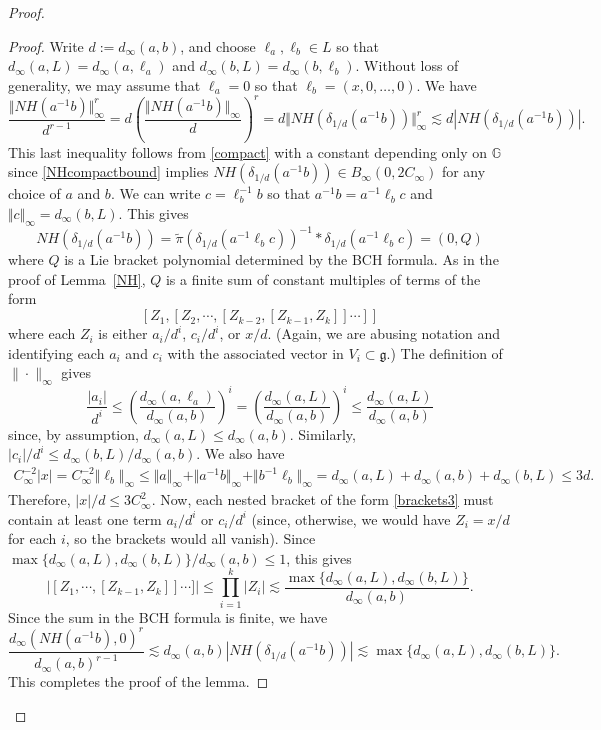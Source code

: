 \documentclass[11pt]{amsart}
\theoremstyle{definition}
\newcommand{\G}{\mathbb G}
\numberwithin{theorem}{section} \numberwithin{equation}{section}
\begin{document}
\begin{proof}
\begin{proof}
Write $d := d_\infty(a,b)$,
and choose $\ell_a,\ell_b \in L$ so that
$
d_\infty(a,L) = d_\infty(a,\ell_a)
$
and
$
d_\infty(b,L) = d_\infty(b,\ell_b)
$.
Without loss of generality,
we may assume that $\ell_a = 0$
so that
$\ell_b = (x,0,\dots,0)$.
We have
$$
\frac{\Vert NH(a^{-1}b) \Vert_\infty^{r}}{d^{r-1}} 
= d \left( \frac{\Vert NH(a^{-1}b) \Vert_\infty}{d} \right)^r
= d \Vert NH(\delta_{1/d}(a^{-1}b)) \Vert_\infty^r
\lesssim d |NH(\delta_{1/d}(a^{-1}b))|.
$$
This last inequality follows from %
\eqref{compact}
with a constant depending only on $\G$ 
since \eqref{NHcompactbound} implies $NH(\delta_{1/d}(a^{-1}b)) \in B_{\infty}(0,2C_{\infty})$
for any choice of $a$ and $b$.
We can write $c = \ell_b^{-1} b$ so that
$
a^{-1}b = a^{-1} \ell_b c
$
and 
$
\Vert c \Vert_\infty = d_\infty(b,L)
$.
This gives
$$
NH(\delta_{1/d}(a^{-1}b))
= \tilde{\pi}(\delta_{1/d}(a^{-1} \ell_b c))^{-1} * \delta_{1/d}(a^{-1} \ell_b c)
= (0,Q)
$$
where $Q$ is a Lie bracket polynomial 
determined by the BCH formula.
As in the proof of Lemma~\ref{NH},
$Q$ is a finite sum of constant multiples of terms of the form
\begin{equation}
\label{brackets3}
[Z_1,[Z_2,\cdots,[Z_{k-2},[Z_{k-1},Z_k]]\cdots]]
\end{equation}
where each $Z_i$ is either $a_i/d^i$, $c_i/d^i$, or $x/d$.
(Again, we are abusing notation
and identifying each $a_i$ and $c_i$ with the associated vector in $V_i \subset \mathfrak{g}$.)
The definition of $\| \cdot \|_{\infty}$ gives
$$
\frac{|a_i|}{d^i}
\leq \left( \frac{d_\infty(a,\ell_a)}{d_\infty(a,b)} \right)^i
=\left( \frac{d_\infty(a,L)}{d_\infty(a,b)} \right)^i
\leq \frac{d_\infty(a,L)}{d_\infty(a,b)} 
$$
since, by assumption, $d_\infty(a,L) \leq d_\infty(a,b)$.
Similarly, $|c_i|/d^i \leq d_\infty(b,L) / d_\infty(a,b)$.
We also have
\begin{equation*}
\begin{split}
C_{\infty}^{-2} |x|  = C_{\infty}^{-2} \Vert \ell_b \Vert_\infty 
\leq \Vert a \Vert_\infty + \Vert a^{-1} b \Vert_\infty + \Vert b^{-1} \ell_b \Vert_\infty = d_\infty(a,L) + d_\infty(a,b) + d_\infty(b,L)
\leq 3 d.\end{split}\end{equation*}
Therefore, $|x|/d \leq 3C_{\infty}^{2}$.
Now, each nested bracket of the form \eqref{brackets3}
must contain at least one term $a_i/d^i$ or $c_i/d^i$
(since, otherwise, we would have $Z_i = x/d$ for each $i$, so the brackets would all vanish).
Since $\max \{ d_\infty(a,L),d_\infty(b,L) \} / d_\infty(a,b) \leq 1$, this gives
$$
\left|[Z_1,\cdots,[Z_{k-1},Z_k]]\cdots] \right|
\leq \prod_{i=1}^k |Z_i|
\lesssim \frac{\max \{ d_\infty(a,L),d_\infty(b,L) \}}{d_\infty(a,b)}.
$$
Since the sum in the BCH formula is finite, we have
$$
\frac{d_\infty(NH(a^{-1}b),0)^{r}}{d_\infty(a,b)^{r-1}} 
\lesssim d_\infty(a,b) |NH(\delta_{1/d}(a^{-1}b))|
\lesssim \max \{ d_\infty(a,L),d_\infty(b,L) \}.
$$
This completes the proof of the lemma.
\end{proof}


\end{proof}
\end{document}
